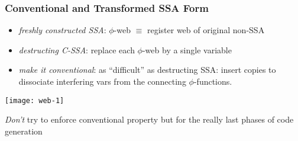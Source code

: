 \begin{frame}
\frametitle{Conventional and Transformed SSA Form}
\begin{itemize}
\item \emph{freshly constructed SSA}: $\phi$-web $\equiv$ register web of original non-SSA
\item \emph{destructing C-SSA}: replace each $\phi$-web by a single variable
\item \emph{make it conventional}: as ``difficult'' as destructing SSA: insert copies to dissociate interfering vars from the connecting $\phi$-functions.
\end{itemize}
\texttt{[image: web-1]}\hfill
{}\hfill
{}
\begin{minipage}{0.7\textwidth}
\begin{alertblock}{}
\emph{Don't} try to enforce conventional property but for the really last phases of code generation
\end{alertblock}
\end{minipage}
\end{frame}


